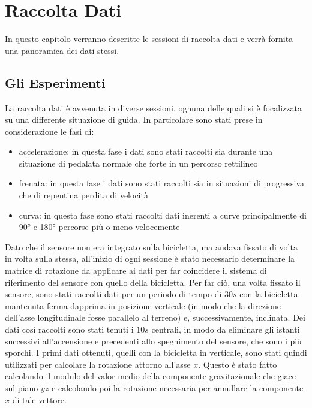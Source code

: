 \documentclass[class=article]{standalone}
\begin{document}
	\section{Raccolta Dati}
	In questo capitolo verranno descritte le sessioni di raccolta dati e verrà fornita una panoramica dei dati stessi.
	
	\subsection{Gli Esperimenti}
	La raccolta dati è avvenuta in diverse sessioni, ognuna delle quali si è focalizzata su una differente situazione di guida. In particolare sono stati prese in considerazione le fasi di:
	\begin{itemize}
		\item accelerazione: in questa fase i dati sono stati raccolti sia durante una situazione di pedalata normale che forte in un percorso rettilineo
		\item frenata: in questa fase i dati sono stati raccolti sia in situazioni di progressiva che di repentina perdita di velocità
		\item curva: in questa fase sono stati raccolti dati inerenti a curve principalmente di 90° e 180° percorse più o meno velocemente
	\end{itemize}
	
	Dato che il sensore non era integrato sulla bicicletta, ma andava fissato di volta in volta sulla stessa, all'inizio di ogni sessione è stato necessario determinare la matrice di rotazione da applicare ai dati per far coincidere il sistema di riferimento del sensore con quello della bicicletta. Per far ciò, una volta fissato il sensore, sono stati raccolti dati per un periodo di tempo di \(30s\) con la bicicletta mantenuta ferma dapprima in posizione verticale (in modo che la direzione dell'asse longitudinale fosse parallelo al terreno) e, successivamente, inclinata. Dei dati così raccolti sono stati tenuti i \(10s\) centrali, in modo da eliminare gli istanti successivi all'accensione e precedenti allo spegnimento del sensore, che sono i più sporchi. I primi dati ottenuti, quelli con la bicicletta in verticale, sono stati quindi utilizzati per calcolare la rotazione attorno all'asse \(x\). Questo è stato fatto calcolando il modulo del valor medio della componente gravitazionale che giace sul piano \(yz\) e calcolando poi la rotazione necessaria per annullare la componente \(x\) di tale vettore.
	
\end{document}
